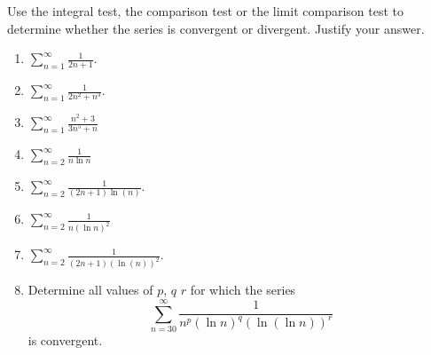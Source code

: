 Use the integral test, the comparison test or the limit comparison test to determine whether the series is convergent or divergent. Justify your answer.
\begin{multicols}{2}
\begin{enumerate}[ref={\fcProblemRef}]
\item 
$\displaystyle \sum\limits_{n=1}^{\infty} \frac{1}{2n+1}$.

\item 
$\displaystyle \sum\limits_{n=1}^{\infty} \frac{1}{2n^2+n^3}$.

\item $\displaystyle \sum\limits_{n=1}^{\infty}\frac{n^2+3}{3n^5+n}$

\item \label{problemConvergencesum_2^infty1/(xlnx)dx}
$\displaystyle \sum_{n=2}^\infty \frac{1}{n \ln n}$

\item  \label{problemConvergencesum_2^infty1/((2n+1)ln(n)}
$\displaystyle \sum\limits_{n=2}^{\infty} \frac{1}{(2n+1)\ln (n)}$.

\item $\displaystyle \sum\limits_{n=2}^{\infty}\frac{1}{n(\ln n)^2}$

\item 
$\displaystyle \sum\limits_{n=2}^{\infty} \frac{1}{(2n+1)(\ln (n))^2}$.

\item 
Determine all values of $p$, $q$ $r$ for which the series 
\[
\displaystyle \sum_{n=30}^{\infty} \frac{1}{n^p(\ln n)^q(\ln (\ln n))^r}
\]
is convergent.


\end{enumerate}
\end{multicols}

